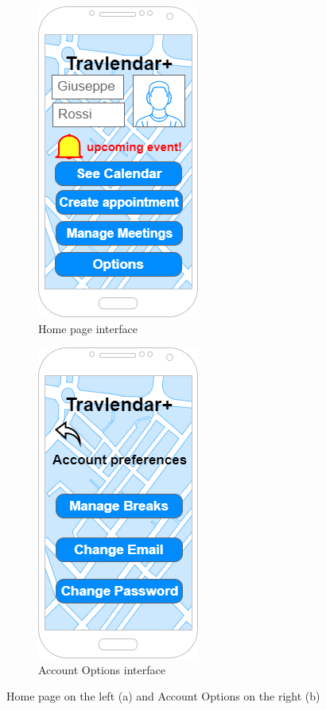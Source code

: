 \begin{figure}[h]
\centering
\begin{subfigure}{.5\textwidth}
  \centering
  \includegraphics[height=.4\textheight, keepaspectratio=true]{Img/Home}
  \caption{Home page interface}
\end{subfigure}%
\begin{subfigure}{.5\textwidth}
  \centering
  \includegraphics[height=.4\textheight, keepaspectratio=true]{Img/AccountOptions}
  \caption{Account Options interface}
\end{subfigure}
\caption{Home page on the left (a) and Account Options on the right (b)}
\end{figure}


